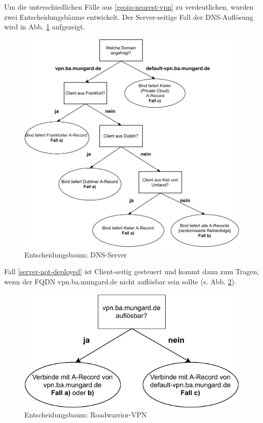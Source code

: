 Um die unterschiedlichen Fälle aus \ref{geoip-nearest-vpn} zu verdeutlichen, wurden zwei Entscheidungsbäume entwickelt. Der Server-seitige Fall der \gls{DNS}-Auflösung wird in Abb. \ref{grafik:Use-Case_2_Entscheidungsbaum_GeoIP} aufgezeigt.
\begin{figure}[h]
  \centering
  \includegraphics{Figures/entscheidungsbaum_bind_geoip.pdf}
  \caption{Entscheidungsbaum: DNS-Server}
  \label{grafik:Use-Case_2_Entscheidungsbaum_GeoIP}
\end{figure}\FloatBarrier

Fall \ref{server-not-deployed} ist \gls{Client}-seitig gesteuert und kommt dann zum Tragen, wenn der \gls{FQDN} vpn.ba.mungard.de nicht auflösbar sein sollte (s. Abb. \ref{grafik:Use-Case_2_Entscheidungsbaum_OpenVPN}).

\begin{figure}[h]
  \centering
  \includegraphics{Figures/entscheidungsbaum_openvpn_config.pdf}
  \caption{Entscheidungsbaum: Roadwarrior-VPN}
  \label{grafik:Use-Case_2_Entscheidungsbaum_OpenVPN}
\end{figure}\FloatBarrier

